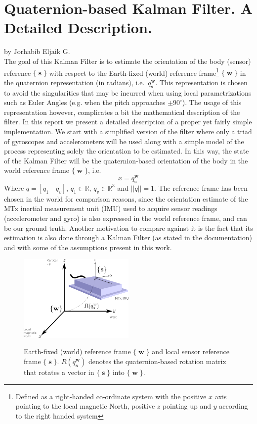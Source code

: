 \documentclass[a4paper,10pt]{article}
\DeclareMathOperator{\sensor}{\mathbf{s}}
\DeclareMathOperator{\world}{\mathbf{w}}
\begin{document}
\section*{Quaternion-based Kalman Filter. A Detailed Description.}
by Jorhabib Eljaik G. \newline \\
The goal of this Kalman Filter is to estimate the orientation of the body (sensor) reference $\{\sensor\}$ with respect to the Earth-fixed (world) reference frame\footnote{Defined as a right-handed co-ordinate system with the positive $x$ axis pointing to the local magnetic North, positive $z$ pointing up and $y$ according to the right handed system} $\{\world\}$ in the quaternion representation (in radians), i.e.~$q^{\world}_{\sensor}$. This representation is chosen to avoid the singularities that may be incurred when using local parametrizations such as Euler Angles (e.g. when the pitch approaches $\pm90^{\circ}$). The usage of this representation however, complicates a bit the mathematical description of the filter. In this report we present a detailed description of a proper yet fairly simple implementation. 
We start with a simplified version of the filter where only a triad of gyroscopes and accelerometers will be used along with a simple model of the process representing solely the orientation to be estimated. In this way, the state of the Kalman Filter will be the quaternion-based orientation of the body in the world reference frame $\{\world\}$, i.e.
\begin{equation}
  x = q^{\world}_{\sensor}
\end{equation}
Where $q = [q_1 \quad q_v]$, $q_1 \in \mathbb{R}$, $q_v \in \mathbb{R}^3$ and $||q|| = 1$. The reference frame has been chosen in the world for comparison reasons, since the orientation estimate of the MTx inertial measurement unit (IMU) used to acquire sensor readings (accelerometer and gyro) is also expressed in the world reference frame, and can be our ground truth. Another motivation to compare against it is the fact that its estimation is also done through a Kalman Filter (as stated in the documentation) and with some of the assumptions present in this work.

\begin{figure}[ht!]
 \centering
 \includegraphics[width=0.5\textwidth]{./fig/MixCoordSys.png}
 \label{fig:coordsys}
 \caption{Earth-fixed (world) reference frame $\{\world\}$ and local sensor reference frame $\{\sensor\}$. $R(q^{\world}_{\sensor})$ denotes the quaternion-based rotation matrix that rotates a vector in $\{\sensor\}$ into $\{\world\}$. }
\end{figure}
\end{document}
